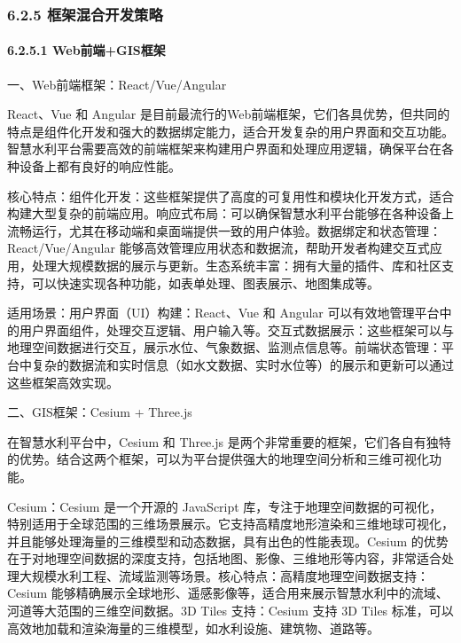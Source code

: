 \subsubsection{6.2.5 框架混合开发策略}\label{ux6846ux67b6ux6df7ux5408ux5f00ux53d1ux7b56ux7565}

\paragraph{6.2.5.1 Web前端+GIS框架}\label{webux524dux7aefgisux6846ux67b6}

一、Web前端框架：React/Vue/Angular

React、Vue 和 Angular 是目前最流行的Web前端框架，它们各具优势，但共同的特点是组件化开发和强大的数据绑定能力，适合开发复杂的用户界面和交互功能。智慧水利平台需要高效的前端框架来构建用户界面和处理应用逻辑，确保平台在各种设备上都有良好的响应性能。

核心特点：组件化开发：这些框架提供了高度的可复用性和模块化开发方式，适合构建大型复杂的前端应用。响应式布局：可以确保智慧水利平台能够在各种设备上流畅运行，尤其在移动端和桌面端提供一致的用户体验。数据绑定和状态管理：React/Vue/Angular 能够高效管理应用状态和数据流，帮助开发者构建交互式应用，处理大规模数据的展示与更新。生态系统丰富：拥有大量的插件、库和社区支持，可以快速实现各种功能，如表单处理、图表展示、地图集成等。

适用场景：用户界面（UI）构建：React、Vue 和 Angular 可以有效地管理平台中的用户界面组件，处理交互逻辑、用户输入等。交互式数据展示：这些框架可以与地理空间数据进行交互，展示水位、气象数据、监测点信息等。前端状态管理：平台中复杂的数据流和实时信息（如水文数据、实时水位等）的展示和更新可以通过这些框架高效实现。

二、GIS框架：Cesium + Three.js

在智慧水利平台中，Cesium 和 Three.js 是两个非常重要的框架，它们各自有独特的优势。结合这两个框架，可以为平台提供强大的地理空间分析和三维可视化功能。

Cesium：Cesium 是一个开源的 JavaScript 库，专注于地理空间数据的可视化，特别适用于全球范围的三维场景展示。它支持高精度地形渲染和三维地球可视化，并且能够处理海量的三维模型和动态数据，具有出色的性能表现。Cesium 的优势在于对地理空间数据的深度支持，包括地图、影像、三维地形等内容，非常适合处理大规模水利工程、流域监测等场景。核心特点：高精度地理空间数据支持：Cesium 能够精确展示全球地形、遥感影像等，适合用来展示智慧水利中的流域、河道等大范围的三维空间数据。3D Tiles 支持：Cesium 支持 3D Tiles 标准，可以高效地加载和渲染海量的三维模型，如水利设施、建筑物、道路等。

